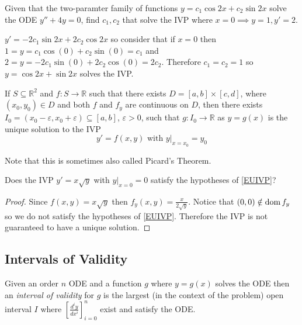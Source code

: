 \documentclass[notes]{subfiles}
\begin{document}
\begin{exercise}
    Given that the two-paramter family of functions $y = c_1\cos 2x + c_2\sin 2x$ solve the ODE $y'' + 4y = 0$, find $c_1, c_2$ that solve the IVP where $x = 0 \implies y = 1, y' = 2$.
\end{exercise}
\begin{solution}
    $y' = -2c_1 \sin 2x + 2c_2 \cos 2x$ so consider that if $x = 0$ then
    $1 = y = c_1 \cos (0) + c_2 \sin (0) = c_1$ and $2 = y = -2c_1 \sin (0) + 2c_2 \cos (0) = 2c_2$. Therefore $c_1 = c_2 = 1$ so $y = \cos 2x + \sin 2x$ solves the IVP.
\end{solution}

\begin{theorem} \label{EUIVP}
    If $S \subseteq \mathbb{R}^2$ and $f\colon S \to \mathbb{R}$ such that there exists $D = [a, b] \times [c, d]$, where $(x_0, y_0) \in D$ and both $f$ and $f_y$ are continuous on $D$, then there exists $I_0 = (x_0 - \varepsilon, x_0 + \varepsilon) \subseteq [a, b]$, $\varepsilon >0$, such that $g\colon I_0 \to \mathbb{R}$ as $y = g(x)$ is the unique solution to the IVP
    \[
        y' = f(x, y) \text{ with } y|_{x = x_0} = y_0
    \]
\end{theorem}

Note that this is sometimes also called Picard's Theorem.

\begin{exercise}
    Does the IVP $y' = x\sqrt{y}$ with $y|_{x = 0} = 0$ satisfy the hypotheses of \cref{EUIVP}?
\end{exercise}
\begin{proof}
    Since $f(x, y) = x\sqrt{y}$ then $f_y(x, y) = \frac{x}{2\sqrt{y}}$. Notice that $(0, 0) \notin \operatorname{dom} f_y$ so we do not satisfy the hypotheses of \cref{EUIVP}. Therefore the IVP is not guaranteed to have a unique solution.
\end{proof}

\subsection{Intervals of Validity}
\begin{definition}
    Given an order $n$ ODE and a function $g$ where $y = g(x)$ solves the ODE then an \textit{interval of validity} for $g$ is the largest (in the context of the problem) open interval $I$ where $\left[ \frac{d^i y}{dx^i} \right]_{i = 0}^n$ exist and satisfy the ODE. 
\end{definition}
\end{document}
